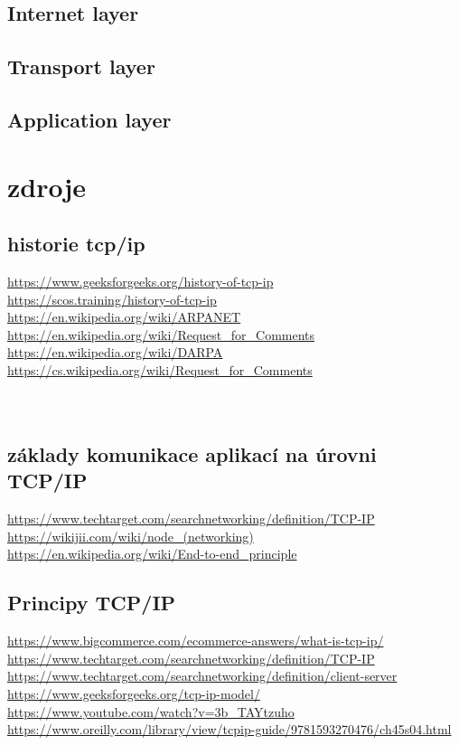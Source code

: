 \documentclass[12pt]{article}
\begin{document}
\subsection{Internet layer}

\subsection{Transport layer}

\subsection{Application layer}


\clearpage
\section{zdroje}
\subsection{historie tcp/ip}
\url{https://www.geeksforgeeks.org/history-of-tcp-ip}
\\
\url{https://scos.training/history-of-tcp-ip}
\\
\url{https://en.wikipedia.org/wiki/ARPANET}
\\
\url{https://en.wikipedia.org/wiki/Request_for_Comments}
\\
\url{https://en.wikipedia.org/wiki/DARPA}
\\
\url{https://cs.wikipedia.org/wiki/Request_for_Comments}
\\
\url{}
\\
\url{}
\\
\subsection{základy komunikace aplikací na úrovni TCP/IP}
\url{https://www.techtarget.com/searchnetworking/definition/TCP-IP}
\\
\url{https://wikijii.com/wiki/node_(networking)}
\\
\url{https://en.wikipedia.org/wiki/End-to-end_principle}
\\
\subsection{Principy TCP/IP}
\url{https://www.bigcommerce.com/ecommerce-answers/what-is-tcp-ip/}
\\
\url{https://www.techtarget.com/searchnetworking/definition/TCP-IP}
\\
\url{https://www.techtarget.com/searchnetworking/definition/client-server}
\\
\url{https://www.geeksforgeeks.org/tcp-ip-model/}
\\
\url{https://www.youtube.com/watch?v=3b_TAYtzuho}
\\
\url{https://www.oreilly.com/library/view/tcpip-guide/9781593270476/ch45s04.html}
\end{document}
